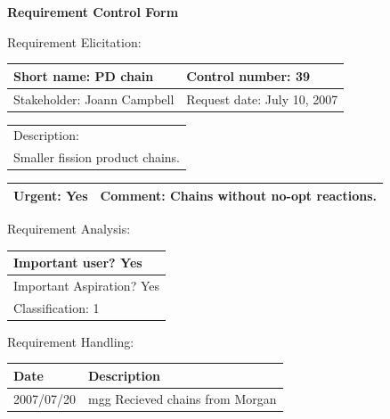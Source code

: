 \begin{center}\Large\bf
Requirement Control Form
\end{center}
\vspace{24pt}

Requirement Elicitation:

\begin{tabular}{|p{211pt}|p{211pt}|} \hline
Short name: PD chain & Control number: 39\\ \hline
Stakeholder: Joann Campbell & Request date: July 10, 2007\\
\end{tabular}
\begin{tabular}{|p{433pt}|} \hline
Description: \\ 
Smaller fission product chains.\\
\hline
\end{tabular} 
\begin{tabular}{|p{211pt}|p{211pt}|} \hline
Urgent: Yes & Comment: Chains without no-opt reactions. \\ \hline
\end{tabular}

\vspace{24pt}

Requirement Analysis:

\begin{tabular}{|p{433pt}|} \hline
Important user? Yes \\ \hline
Important Aspiration? Yes \\ \hline
Classification: 1 \\ \hline
\end{tabular}
\vspace{24pt}

Requirement Handling:

\begin{tabular}{|p{72pt}|p{351pt}|} \hline
Date & Description \\ \hline
2007/07/20 & mgg Recieved chains from Morgan \\ \hline
\end{tabular}
